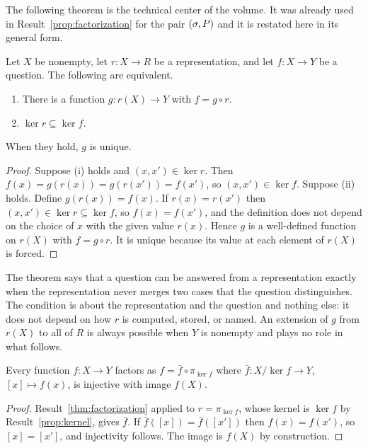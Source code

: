 The following theorem is the technical center of the volume. It was already used in Result~\ref{prop:factorization} for the pair $(\sigma,P)$ and it is restated here in its general form.

\begin{established}\label{thm:factorization}
Let $X$ be nonempty, let $r:X\to R$ be a representation, and let $f:X\to Y$ be a question. The following are equivalent.
\begin{enumerate}[nosep,label=(\roman*)]
  \item There is a function $g:r(X)\to Y$ with $f=g\circ r$.
  \item $\ker r\subseteq\ker f$.
\end{enumerate}
When they hold, $g$ is unique.
\end{established}
\begin{proof}
Suppose (i) holds and $(x,x')\in\ker r$. Then $f(x)=g(r(x))=g(r(x'))=f(x')$, so $(x,x')\in\ker f$. Suppose (ii) holds. Define $g(r(x))=f(x)$. If $r(x)=r(x')$ then $(x,x')\in\ker r\subseteq\ker f$, so $f(x)=f(x')$, and the definition does not depend on the choice of $x$ with the given value $r(x)$. Hence $g$ is a well-defined function on $r(X)$ with $f=g\circ r$. It is unique because its value at each element of $r(X)$ is forced.
\end{proof}

The theorem says that a question can be answered from a representation exactly when the representation never merges two cases that the question distinguishes. The condition is about the representation and the question and nothing else: it does not depend on how $r$ is computed, stored, or named. An extension of $g$ from $r(X)$ to all of $R$ is always possible when $Y$ is nonempty and plays no role in what follows.

\begin{established}\label{prop:canonical}
Every function $f:X\to Y$ factors as $f=\bar f\circ\pi_{\ker f}$ where $\bar f:X/{\ker f}\to Y$, $[x]\mapsto f(x)$, is injective with image $f(X)$.
\end{established}
\begin{proof}
Result~\ref{thm:factorization} applied to $r=\pi_{\ker f}$, whose kernel is $\ker f$ by Result~\ref{prop:kernel}, gives $\bar f$. If $\bar f([x])=\bar f([x'])$ then $f(x)=f(x')$, so $[x]=[x']$, and injectivity follows. The image is $f(X)$ by construction.
\end{proof}

